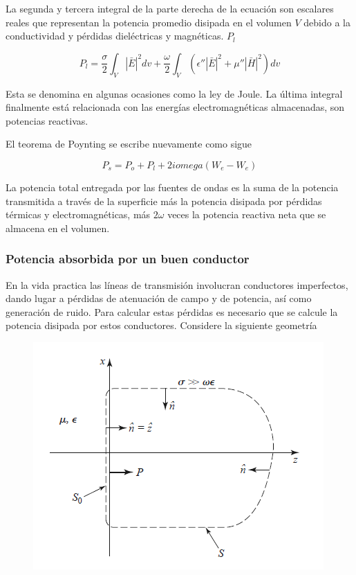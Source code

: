 La segunda y tercera integral de la parte derecha de la ecuación son escalares reales que representan la potencia promedio disipada en el volumen $V$ debido a la conductividad y pérdidas dieléctricas y magnéticas. $P_l$

\begin{equation*}
P_l =  \frac{\sigma}{2} \int_V |\bar{E}|^2 d v + \frac{\omega}{2} \int_V (\epsilon'' |\bar{E}|^2 + \mu'' |\bar{H}|^2) d v 
\end{equation*}

Esta se denomina en algunas ocasiones como la ley de Joule. La última integral finalmente está relacionada con las energías electromagnéticas almacenadas, son potencias reactivas.

El teorema de Poynting se escribe nuevamente como sigue

\begin{equation*}
P_s = P_o + P_l + 2 i omega (W_e - W_e)
\end{equation*}

La potencia total entregada por las fuentes de ondas es la suma de la potencia transmitida a través de la superficie más la potencia disipada por pérdidas térmicas y electromagnéticas, más $2 \omega$ veces la potencia reactiva neta que se almacena en el volumen.

\subsubsection*{Potencia absorbida por un buen conductor}


En la vida practica las líneas de transmisión involucran conductores imperfectos, dando lugar a pérdidas de atenuación de campo y de potencia, así como generación de ruido. Para calcular estas pérdidas es necesario que se calcule la potencia disipada por estos conductores. Considere la siguiente geometría

\begin{figure}[H]
    \centering
    \includegraphics[]{Waves/waves_f10.png}
\end{figure}

